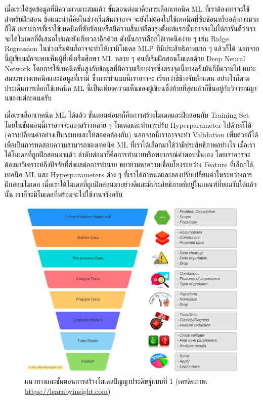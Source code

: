 เมื่อเราได้ชุดข้อมูลที่มีความเหมาะสมแล้ว ขั้นตอนต่อมาคือการเลือกเทคนิค ML ที่เราต้องการจะใช้สำหรับฝึกสอน ข้อแนะนำก็คือในช่วงเริ่มต้นเราอาจ%
จะยังไม่ต้องไปใช้เทคนิคที่ซับซ้อนหรืออลังการมากก็ได้ เพราะการที่เราใช้เทคนิคที่ซับซ้อนหรือมีความสิ้นเปลืองสูงตั้งแต่แรกนั้นอาจจะไม่ได้การันตีว่าเรา%
จะได้โมเดลที่ดีเสมอไปและยังเสียเวลาอีกด้วย ดังนั้นการเลือกใช้เทคนิคง่าย ๆ เช่น Ridge Regression ในช่วงเริ่มต้นก็อาจจะทำให้เรามีโมเดล MLP 
ที่มีประสิทธิภาพมาก ๆ แล้วก็ได้ นอกจากนี้ผู้เขียนมักจะพบเห็นผู้ที่เพิ่งเริ่มศึกษา ML หลาย ๆ คนที่เริ่มฝึกสอนโมเดลด้วย Deep Neural Network 
โดยการใช้เทคนิคขั้นสูงกับข้อมูลที่มีความเรียบง่ายซึ่งตรงจุดนี้บางครั้งมันก็มีความไม่เหมาะสมระหว่างเทคนิคและข้อมูลที่เรามี ซึ่งการทำแบบนี้เราอาจจะ%
เรียกว่าขี่ช้างจับตั๊กแตน อย่างไรก็ตามประเด็นการเลือกใช้เทคนิค ML นี้เป็นเพียงความเห็นของผู้เขียนซึ่งท้ายที่สุดแล้วก็ขึ้นอยู่กับวิจารณญานของแต่ละคนครับ

เมื่อเราเลือกเทคนิค ML ได้แล้ว ขั้นตอนต่อมาก็คือการสร้างโมเดลและฝึกสอนกับ Training Set โดยในขั้นตอนนี้เราอาจจะลองสร้างหลาย ๆ 
โมเดลและทำการปรับ Hyperparameter ไปด้วยก็ได้ (ควรเปลี่ยนค่าอย่างเป็นระบบและให้สอดคล้องกัน) นอกจากนี้เราอาจจะทำ Validation 
เพิ่มด้วยก็ได้เพื่อเป็นการทดสอบความสามารถของเทคนิค ML ที่เราได้เลือกมาใช้ว่ามีประสิทธิภาพอย่างไร เมื่อเราได้โมเดลที่ถูกฝึกสอนมาแล้ว 
ลำดับต่อมาก็คือการทำนายหรือพยากรณ์คำตอบนั่นเอง โดยเราควรจะต้องมาวิเคราะห์ถึงปัจจัยที่ส่งผลต่อการทำนาย พยายามหาความเชื่อมโยงระหว่าง 
Feature ที่เลือกใช้, เทคนิค ML และ Hyperparameters ต่าง ๆ ที่เราได้กำหนดและลองปรับเปลี่ยนค่าในระหว่างการฝึกสอนโมเดล 
เมื่อเราได้โมเดลที่ถูกฝึกสอนมาอย่างดีและมีประสิทธิภาพที่อยู่ในเกณฑ์ที่ยอมรับได้แล้วนั้น เราก็จะมีโมเดลที่พร้อมจะไปใช้งานจริงครับ

\begin{figure}[htbp]
    \centering
    \includegraphics[width=\linewidth]{fig/ml_workflow.png}
    \caption{แนวทางและขั้นตอนการสร้างโมเดลปัญญาประดิษฐ์แบบที่ 1 (เครดิตภาพ: \url{https://learnbyinsight.com})}
    \label{fig:ml_workflow}
\end{figure}

